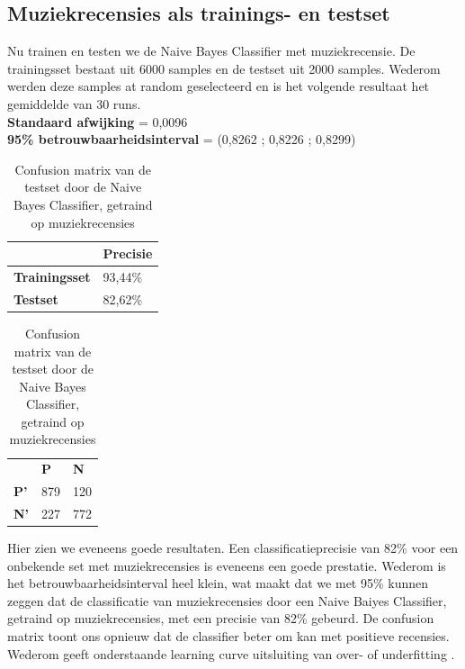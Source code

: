 \subsection{Muziekrecensies als trainings- en testset}\label{Muziek als trainings- en testset}

Nu trainen en testen we de Naive Bayes Classifier met muziekrecensie. De trainingsset bestaat uit 6000 samples en de testset uit 2000 samples. Wederom werden deze samples at random geselecteerd en is het volgende resultaat het gemiddelde van 30 runs.\\

\textbf{Standaard afwijking} = 0,0096\\
\textbf{95\% betrouwbaarheidsinterval} = (0,8262 ; 0,8226 ; 0,8299)\\
 
\begin{table}[h]
\centering
\setlength\tabcolsep{4pt}
\begin{minipage}[t]{0.48\textwidth}
\centering
\begin{tabular}{l|l|}
\cline{2-2}
                                            & \textbf{Precisie} \\ \hline
\multicolumn{1}{|l|}{\textbf{Trainingsset}} & 93,44\%           \\ \hline
\multicolumn{1}{|l|}{\textbf{Testset}}      & 82,62\%           \\ \hline
\end{tabular}
\caption{Classificatieprecisie Naive Bayes Classifier, getraind op muziekrecensies}
\end{minipage}%
\hfill
\begin{minipage}[t]{0.48\textwidth}
\centering
\begin{tabular}{lll}
                                 & \textbf{P}               & \textbf{N}               \\ \cline{2-3} 
\multicolumn{1}{l|}{\textbf{P'}} & \multicolumn{1}{l|}{879} & \multicolumn{1}{l|}{120} \\ \cline{2-3} 
\multicolumn{1}{l|}{\textbf{N'}} & \multicolumn{1}{l|}{227} & \multicolumn{1}{l|}{772} \\ \cline{2-3} 
\end{tabular}
\caption{Confusion matrix van de testset door de  Naive Bayes Classifier, getraind op muziekrecensies} 
\end{minipage}
\end{table}

Hier zien we eveneens goede resultaten. Een classificatieprecisie van 82\% voor een onbekende set met muziekrecensies is eveneens een goede prestatie. Wederom is het betrouwbaarheidsinterval heel klein, wat maakt dat we met 95\% kunnen zeggen dat de classificatie van muziekrecensies door een Naive Baiyes Classifier, getraind op muziekrecensies, met een precisie van 82\% gebeurd. De confusion matrix toont ons opnieuw dat de classifier beter om kan met positieve recensies.
%
Wederom geeft onderstaande learning curve uitsluiting van over- of underfitting .

